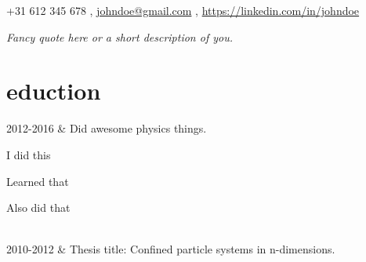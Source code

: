 \documentclass[]{cv-roald}
\begin{document}
\pagestyle{empty} %

{\faMobile \hspace{\FAspace} +31 612 345 678 \sep \faEnvelope \hspace{\FAspace} \href{mailto:johndoe@gmail.com}{johndoe@gmail.com} \sep \faLinkedinSquare \hspace{\FAspace} \href{https://linkedin.com/in/johndoe}{https://linkedin.com/in/johndoe}
}

\textit{Fancy quote here or a short description of you.}

\section*{eduction}
\begin{tabularcv}
    2012-2016   &   
                    \newline Did awesome physics things.
                    \begin{tabitemize}
                        \item I did this
                        \item Learned that
                        \item Also did that
                    \end{tabitemize}
                    \\[\vspacepar] %
    2010-2012   &   
                    \newline Thesis title: Confined particle systems in n-dimensions.
\end{tabularcv}
\end{document}
